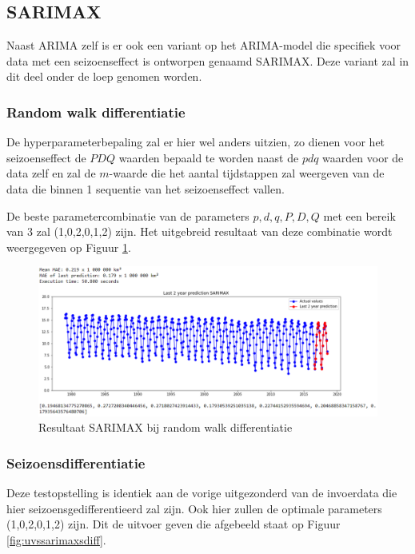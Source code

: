 \clearpage
\subsection{SARIMAX}

Naast ARIMA zelf is er ook een variant op het ARIMA-model die specifiek voor data met een seizoenseffect is ontworpen genaamd SARIMAX. Deze variant zal in dit deel onder de loep genomen worden.

\subsubsection{Random walk differentiatie} 

De hyperparameterbepaling zal er hier wel anders uitzien, zo dienen voor het seizoenseffect de $PDQ$ waarden bepaald te worden naast de $pdq$ waarden voor de data zelf en zal de $m$-waarde die het aantal tijdstappen zal weergeven van de data die binnen 1 sequentie van het seizoenseffect vallen.

De beste parametercombinatie van de parameters $p, d, q, P, D, Q$ met een bereik van 3 zal (1,0,2,0,1,2) zijn. Het uitgebreid resultaat van deze combinatie wordt weergegeven op Figuur \ref{fig:uvssarimaxdiff}.

\begin{figure}[!h]
    \centering
    \caption{Resultaat SARIMAX bij random walk differentiatie}
    \label{fig:uvssarimaxdiff}
    \includegraphics[width=1\linewidth]{uv_s_sarimax_diff}
\end{figure}


\subsubsection{Seizoensdifferentiatie}

Deze testopstelling is identiek aan de vorige uitgezonderd van de invoerdata die hier seizoensgedifferentieerd zal zijn. Ook hier zullen de optimale parameters (1,0,2,0,1,2) zijn. Dit de uitvoer geven die afgebeeld staat op Figuur \ref{fig:uvssarimaxsdiff}.

